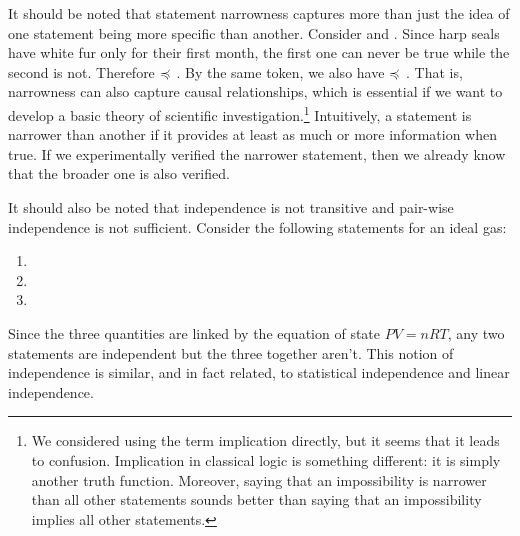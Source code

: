	
	It should be noted that statement narrowness captures more than just the idea of one statement being more specific than another. Consider  and . Since harp seals have white fur only for their first month, the first one can never be true while the second is not. Therefore  $\preccurlyeq$ . By the same token, we also have  $\preccurlyeq$ . That is, narrowness can also capture causal relationships, which is essential if we want to develop a basic theory of scientific investigation.\footnote{We considered using the term implication directly, but it seems that it leads to confusion. Implication in classical logic is something different: it is simply another truth function. Moreover, saying that an impossibility is narrower than all other statements sounds better than saying that an impossibility implies all other statements.} Intuitively, a statement is narrower than another if it provides at least as much or more information when true. If we experimentally verified the narrower statement, then we already know that the broader one is also verified.
	
	It should also be noted that independence is not transitive and pair-wise independence is not sufficient. Consider the following statements for an ideal gas:
	\begin{enumerate}
		\item {}
		\item {}
		\item {}
	\end{enumerate}
	Since the three quantities are linked by the equation of state $PV=nRT$, any two statements are independent but the three together aren't. This notion of independence is similar, and in fact related, to statistical independence and linear independence.
	
